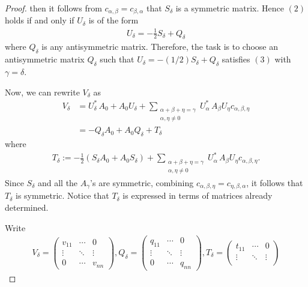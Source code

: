 \documentclass[12pt]{amsart}
\theoremstyle{plain}
\theoremstyle{definition}
\begin{document}
\begin{proof}
  then it follows from $c_{\alpha, \beta} = c_{\beta, \alpha}$ that $S_{\delta}$ is a symmetric matrix. Hence $(2)$ holds if and only if $U_{\delta}$ is of the form
  \begin{align*}
    U_{\delta} = - \frac{1}{2}S_{\delta} + Q_{\delta}
  \end{align*}
  where $Q_{\delta}$ is any antisymmetric matrix. Therefore, the task is to choose an antisymmetric matrix $Q_{\delta}$ such that $U_{\delta} = - (1/2) S_{\delta} + Q_{\delta}$ satisfies $(3)$ with $\gamma = \delta$. \par
  Now, we can rewrite $V_{\delta}$ as
  \begin{align*}
    V_{\delta} &= U_{\delta}^* \, A_0 + A_0 U_{\delta} + \sum_{\substack{\alpha + \beta + \eta = \gamma \\ \alpha, \eta \neq 0}} U_{\alpha}^* \, A_{\beta} U_{\eta} c_{\alpha, \beta, \eta} \\
    &= -Q_{\delta}A_0 + A_0 Q_{\delta} + T_{\delta}
  \end{align*}
  where
  \begin{align*}
    T_{\delta} := - \frac{1}{2}(S_{\delta} A_0 + A_0 S_{\delta}) + \sum_{\substack{\alpha + \beta + \eta = \gamma \\ \alpha, \eta \neq 0}} U_{\alpha}^* \, A_{\beta} U_{\eta} c_{\alpha, \beta, \eta}.
  \end{align*}
  Since $S_{\delta}$ and all the $A_{\gamma}$'s are symmetric, combining $c_{\alpha, \beta, \eta} = c_{\eta, \beta, \alpha}$, it follows that $T_{\delta}$ is symmetric. Notice that $T_{\delta}$ is expressed in terms of matrices already determined. \par
  Write
  \begin{align*}
    V_{\delta} = 
    \begin{pmatrix}
      v_{11} & \cdots & 0 \\
      \vdots & \ddots & \vdots \\
      0 & \cdots & v_{nn}
    \end{pmatrix},
    Q_{\delta} =
    \begin{pmatrix}
      q_{11} & \cdots & 0 \\
      \vdots & \ddots & \vdots \\
      0 & \cdots & q_{nn}
    \end{pmatrix},
    T_{\delta} = 
    \begin{pmatrix}
      t_{11} & \cdots & 0 \\
      \vdots & \ddots & \vdots \\

\end{pmatrix}
\end{align*}
\end{proof}
\end{document}
